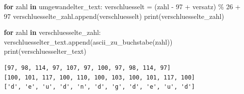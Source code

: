 \documentclass[
  letterpaper,
  DIV=11,
  numbers=noendperiod]{scrreprt}
\newenvironment{Shaded}{\begin{snugshade}}{\end{snugshade}}
\newcommand{\BuiltInTok}[1]{\textcolor[rgb]{0.00,0.23,0.31}{#1}}
\newcommand{\ControlFlowTok}[1]{\textcolor[rgb]{0.00,0.23,0.31}{\textbf{#1}}}
\newcommand{\DecValTok}[1]{\textcolor[rgb]{0.68,0.00,0.00}{#1}}
\newcommand{\KeywordTok}[1]{\textcolor[rgb]{0.00,0.23,0.31}{\textbf{#1}}}
\newcommand{\NormalTok}[1]{\textcolor[rgb]{0.00,0.23,0.31}{#1}}
\newcommand{\OperatorTok}[1]{\textcolor[rgb]{0.37,0.37,0.37}{#1}}
\begin{document}
\begin{tcolorbox}
\begin{tcolorbox}
\begin{Shaded}
\begin{Highlighting}[]
\ControlFlowTok{for}\NormalTok{ zahl }\KeywordTok{in}\NormalTok{ umgewandelter\_text:    }
\NormalTok{    verschluesselt }\OperatorTok{=}\NormalTok{ (zahl }\OperatorTok{{-}} \DecValTok{97} \OperatorTok{+}\NormalTok{ versatz) }\OperatorTok{\%} \DecValTok{26} \OperatorTok{+} \DecValTok{97}
\NormalTok{    verschluesselte\_zahl.append(verschluesselt)}
\BuiltInTok{print}\NormalTok{(verschluesselte\_zahl)}


\ControlFlowTok{for}\NormalTok{ zahl }\KeywordTok{in}\NormalTok{ verschluesselte\_zahl:    }
\NormalTok{    verschluesselter\_text.append(ascii\_zu\_buchstabe(zahl))}
\BuiltInTok{print}\NormalTok{(verschluesselter\_text)}
\end{Highlighting}
\end{Shaded}

\begin{verbatim}
[97, 98, 114, 97, 107, 97, 100, 97, 98, 114, 97]
[100, 101, 117, 100, 110, 100, 103, 100, 101, 117, 100]
['d', 'e', 'u', 'd', 'n', 'd', 'g', 'd', 'e', 'u', 'd']
\end{verbatim}

\end{tcolorbox}

\end{tcolorbox}
\end{document}
